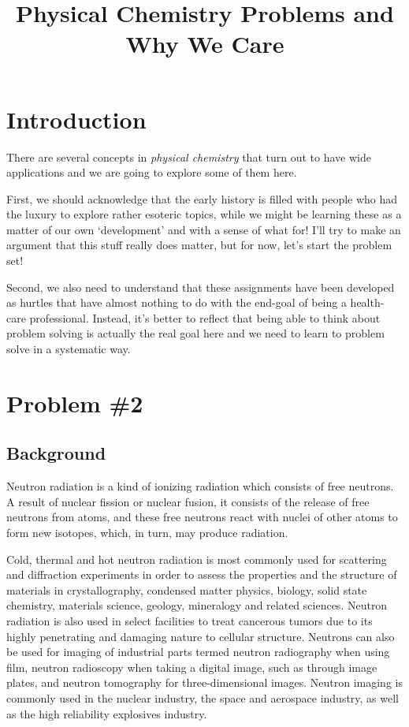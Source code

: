 \documentclass{article}
\title{Physical Chemistry Problems and Why We Care}
\begin{document}

\maketitle

\section{Introduction}

There are several concepts in \emph{physical chemistry} that turn out to have wide applications and we are going to explore some of them here. 

First, we should acknowledge that the early history is filled with people who had the luxury to explore rather esoteric topics, while we might be learning these as a matter of our own `development' and with a sense of what for!  I'll try to make an argument that this stuff really does matter, but for now, let's start the problem set!

Second, we also need to understand that these assignments have been developed as hurtles that have almost nothing to do with the end-goal of being a health-care professional. Instead, it's better to reflect that being able to think about problem solving is actually the real goal here and we need to learn to problem solve in a systematic way.


\section{Problem \#2}

\subsection{Background}
Neutron radiation is a kind of ionizing radiation which consists of free neutrons. A result of nuclear fission or nuclear fusion, it consists of the release of free neutrons from atoms, and these free neutrons react with nuclei of other atoms to form new isotopes, which, in turn, may produce radiation.

Cold, thermal and hot neutron radiation is most commonly used for scattering and diffraction experiments in order to assess the properties and the structure of materials in crystallography, condensed matter physics, biology, solid state chemistry, materials science, geology, mineralogy and related sciences. Neutron radiation is also used in select facilities to treat cancerous tumors due to its highly penetrating and damaging nature to cellular structure. Neutrons can also be used for imaging of industrial parts termed neutron radiography when using film, neutron radioscopy when taking a digital image, such as through image plates, and neutron tomography for three-dimensional images. Neutron imaging is commonly used in the nuclear industry, the space and aerospace industry, as well as the high reliability explosives industry.
\end{document}
